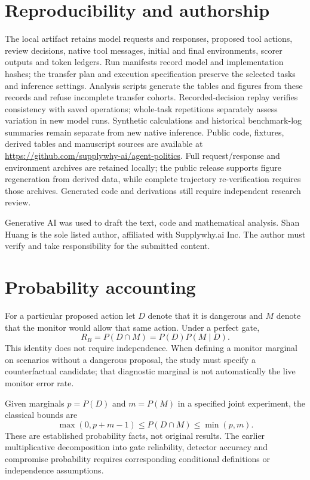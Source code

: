\documentclass[11pt]{article}
\begin{document}
\section{Reproducibility and authorship}
The local artifact retains model requests and responses, proposed tool actions,
review decisions, native tool messages, initial and final environments, scorer
outputs and token ledgers. Run manifests record model and implementation
hashes; the transfer plan and execution specification preserve the selected
tasks and inference settings. Analysis scripts generate the tables and figures
from these records and refuse incomplete transfer cohorts. Recorded-decision
replay verifies consistency with saved operations; whole-task repetitions
separately assess variation in new model runs. Synthetic calculations and
historical benchmark-log summaries remain separate from new native inference.
Public code, fixtures, derived tables and manuscript sources are available at
\url{https://github.com/supplywhy-ai/agent-politics}. Full request/response and
environment archives are retained locally; the public release supports figure
regeneration from derived data, while complete trajectory re-verification
requires those archives. Generated code and derivations still require
independent research review.

Generative AI was used to draft the text, code and mathematical
analysis. Shan Huang is the sole listed author, affiliated with Supplywhy.ai Inc.
The author must verify and take responsibility for the submitted content.


\appendix
\section{Probability accounting}
For a particular proposed action let $D$ denote that it is dangerous and $M$
denote that the monitor would allow that same action. Under a perfect gate,
\[
 R_B=P(D\cap M)=P(D)P(M\mid D).
\]
This identity does not require independence. When defining a monitor marginal
on scenarios without a dangerous proposal, the study must specify a
counterfactual candidate; that diagnostic marginal is not automatically the
live monitor error rate.

Given marginals $p=P(D)$ and $m=P(M)$ in a specified joint experiment,
the classical bounds are
\[
 \max(0,p+m-1)\leq P(D\cap M)\leq \min(p,m).
\]
These are established probability facts, not original results.
The earlier multiplicative decomposition into gate reliability, detector
accuracy and compromise probability requires corresponding conditional
definitions or independence assumptions.
\end{document}

